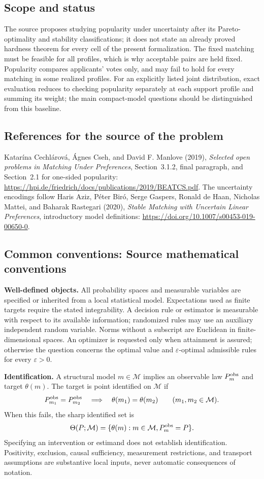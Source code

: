 \documentclass[11pt,a4paper]{article}
\begin{document}
\subsection*{Scope and status}
The source proposes studying popularity under uncertainty after its Pareto-optimality and stability classifications; it does not state an already proved hardness theorem for every cell of the present formalization. The fixed matching must be feasible for all profiles, which is why acceptable pairs are held fixed. Popularity compares applicants' votes only, and may fail to hold for every matching in some realized profiles. For an explicitly listed joint distribution, exact evaluation reduces to checking popularity separately at each support profile and summing its weight; the main compact-model questions should be distinguished from this baseline.
\subsection*{References for the source of the problem}
Katar\'ina Cechl\'arov\'a, \'Agnes Cseh, and David F. Manlove (2019), \emph{Selected open problems in Matching Under Preferences}, Section~3.1.2, final paragraph, and Section~2.1 for one-sided popularity: \url{https://hpi.de/friedrich/docs/publications/2019/BEATCS.pdf}. The uncertainty encodings follow Haris Aziz, P\'eter Bir\'o, Serge Gaspers, Ronald de Haan, Nicholas Mattei, and Baharak Rastegari (2020), \emph{Stable Matching with Uncertain Linear Preferences}, introductory model definitions: \url{https://doi.org/10.1007/s00453-019-00650-0}.

\subsection*{Common conventions: Source mathematical conventions}

\textbf{Well-defined objects.}
All probability spaces and measurable variables are specified or inherited
from a local statistical model. Expectations used as finite targets require
the stated integrability. A decision rule or estimator is measurable with
respect to its available information; randomized rules may use an auxiliary
independent random variable. Norms without a subscript are Euclidean in
finite-dimensional spaces. An optimizer is requested only when attainment
is assured; otherwise the question concerns the optimal value and
$\varepsilon$-optimal admissible rules for every $\varepsilon>0$.

\textbf{Identification.}
A structural model $m\in\mathcal M$ implies an observable law
$P_m^{\rm obs}$ and target $\theta(m)$. The target is point identified on
$\mathcal M$ if
\[
 P_{m_1}^{\rm obs}=P_{m_2}^{\rm obs}
 \quad\Longrightarrow\quad\theta(m_1)=\theta(m_2)
 \qquad(m_1,m_2\in\mathcal M).
\]
When this fails, the sharp identified set is
\[
 \Theta(P;\mathcal M)=\{\theta(m):m\in\mathcal M,
                                  P_m^{\rm obs}=P\}.
\]
Specifying an intervention or estimand does not establish identification.
Positivity, exclusion, causal sufficiency, measurement restrictions, and
transport assumptions are substantive local inputs, never automatic
consequences of notation.
\end{document}
